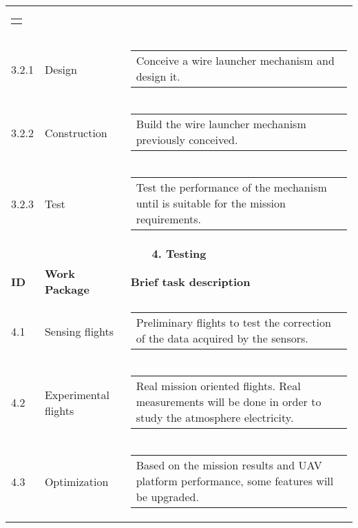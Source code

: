 \begin{longtable}[htb]{@{}lll@{}}
\begin{tabular}[c]{@{}l@{}}
\begin{minipage}[t]{0.7\linewidth}
		\end{minipage}
	\end{tabular} \\
	3.2.1& Design& \begin{tabular}[c]{@{}l@{}}
		\begin{minipage}[t]{0.7\linewidth}
			Conceive a wire launcher mechanism and design it.
		\end{minipage}
	\end{tabular} \\
	3.2.2& Construction& \begin{tabular}[c]{@{}l@{}}
		\begin{minipage}[t]{0.7\linewidth}
			Build the wire launcher mechanism previously conceived. 
		\end{minipage}
	\end{tabular} \\
	3.2.3& Test& \begin{tabular}[c]{@{}l@{}}
		\begin{minipage}[t]{0.7\linewidth}
			Test the performance of the mechanism until is suitable for the mission requirements.
		\end{minipage}
	\end{tabular} \\
	\midrule[2pt]
\multicolumn{3}{c}{\textbf{\large 4. Testing} }\\ \midrule[2pt]
\textbf{ID} & \textbf{Work Package} &\textbf{Brief task description}\\ \midrule[1pt]
	4.1& Sensing flights& \begin{tabular}[c]{@{}l@{}}
		\begin{minipage}[t]{0.7\linewidth}
			Preliminary flights to test the correction of the data acquired by the sensors.
		\end{minipage}
	\end{tabular} \\
	4.2& Experimental flights& \begin{tabular}[c]{@{}l@{}}
		\begin{minipage}[t]{0.7\linewidth}
			Real mission oriented flights. Real measurements will be done in order to study the atmosphere electricity.
		\end{minipage}
	\end{tabular} \\
	4.3& Optimization& \begin{tabular}[c]{@{}l@{}}
		\begin{minipage}[t]{0.7\linewidth}
			Based on the mission results and UAV platform performance, some features will be upgraded. 

\end{minipage}
\end{tabular}
\end{longtable}
